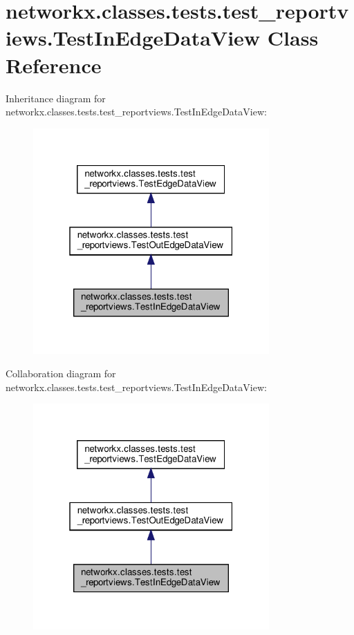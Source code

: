 \hypertarget{classnetworkx_1_1classes_1_1tests_1_1test__reportviews_1_1TestInEdgeDataView}{}\section{networkx.\+classes.\+tests.\+test\+\_\+reportviews.\+Test\+In\+Edge\+Data\+View Class Reference}
\label{classnetworkx_1_1classes_1_1tests_1_1test__reportviews_1_1TestInEdgeDataView}


Inheritance diagram for networkx.\+classes.\+tests.\+test\+\_\+reportviews.\+Test\+In\+Edge\+Data\+View\+:
\nopagebreak
\begin{figure}[H]
\begin{center}
\leavevmode
\includegraphics[width=256pt]{classnetworkx_1_1classes_1_1tests_1_1test__reportviews_1_1TestInEdgeDataView__inherit__graph}
\end{center}
\end{figure}


Collaboration diagram for networkx.\+classes.\+tests.\+test\+\_\+reportviews.\+Test\+In\+Edge\+Data\+View\+:
\nopagebreak
\begin{figure}[H]
\begin{center}
\leavevmode
\includegraphics[width=256pt]{classnetworkx_1_1classes_1_1tests_1_1test__reportviews_1_1TestInEdgeDataView__coll__graph}
\end{center}
\end{figure}
